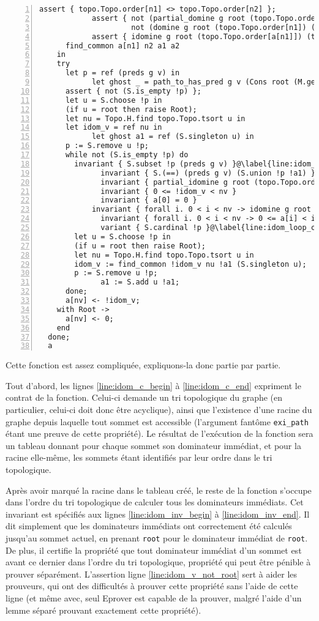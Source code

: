 \documentclass[a4paper,10pt]{article}
\begin{document}
\begin{lstlisting}[numbers=left,escapechar=@]
			assert { topo.Topo.order[n1] <> topo.Topo.order[n2] };
			assert { not (partial_domine g root (topo.Topo.order[n1]) v (S.union a1 a2)) by
			         not (domine g root (topo.Topo.order[n1]) (topo.Topo.order[n2])) };
			assert { idomine g root (topo.Topo.order[a[n1]]) (topo.Topo.order[n1]) };
      find_common a[n1] n2 a1 a2
    in
    try
      let p = ref (preds g v) in
			let ghost _ = path_to_has_pred g v (Cons root (M.get exi_path v)) in
      assert { not (S.is_empty !p) };
      let u = S.choose !p in
      (if u = root then raise Root);
      let nu = Topo.H.find topo.Topo.tsort u in
      let idom_v = ref nu in
			let ghost a1 = ref (S.singleton u) in
      p := S.remove u !p;
      while not (S.is_empty !p) do
        invariant { S.subset !p (preds g v) }@\label{line:idom_loop_c_begin}@
			  invariant { S.(==) (preds g v) (S.union !p !a1) }
			  invariant { partial_idomine g root (topo.Topo.order[!idom_v]) v !a1 }
			  invariant { 0 <= !idom_v < nv }
			  invariant { a[0] = 0 }
		    invariant { forall i. 0 < i < nv -> idomine g root (topo.Topo.order[a[i]]) (topo.Topo.order[i]) }
			  invariant { forall i. 0 < i < nv -> 0 <= a[i] < i }
			  variant { S.cardinal !p }@\label{line:idom_loop_c_end}@
        let u = S.choose !p in
        (if u = root then raise Root);
        let nu = Topo.H.find topo.Topo.tsort u in
        idom_v := find_common !idom_v nu !a1 (S.singleton u);
        p := S.remove u !p;
			  a1 := S.add u !a1;
      done;
      a[nv] <- !idom_v;
    with Root ->
      a[nv] <- 0;
    end
  done;
  a
\end{lstlisting}

Cette fonction est assez compliquée, expliquons-la donc partie par partie.

Tout d'abord, les lignes \ref{line:idom_c_begin} à \ref{line:idom_c_end} expriment le contrat de la fonction. Celui-ci demande un tri topologique du graphe (en particulier, celui-ci doit donc être acyclique), ainsi que l'existence d'une racine du graphe depuis laquelle tout sommet est accessible (l'argument fantôme \lstinline{exi_path} étant une preuve de cette propriété). Le résultat de l'exécution de la fonction sera un tableau donnant pour chaque sommet son dominateur immédiat, et pour la racine elle-même, les sommets étant identifiés par leur ordre dans le tri topologique.

Après avoir marqué la racine dans le tableau créé, le reste de la fonction s'occupe dans l'ordre du tri topologique de calculer tous les dominateurs immédiats. Cet invariant est spécifiés aux lignes \ref{line:idom_inv_begin} à \ref{line:idom_inv_end}. Il dit simplement que les dominateurs immédiats ont correctement été calculés jusqu'au sommet actuel, en prenant \lstinline{root} pour le dominateur immédiat de \lstinline{root}. De plus, il certifie la propriété que tout dominateur immédiat d'un sommet est avant ce dernier dans l'ordre du tri topologique, propriété qui peut être pénible à prouver séparément. L'assertion ligne \ref{line:idom_v_not_root} sert à aider les prouveurs, qui ont des difficultés à prouver cette propriété sans l'aide de cette ligne (et même avec, seul Eprover est capable de la prouver, malgré l'aide d'un lemme séparé prouvant exactement cette propriété).
\end{document}
